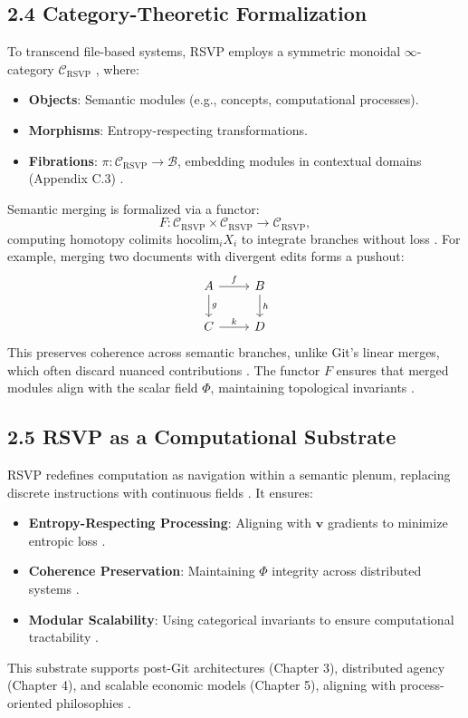 \documentclass[12pt]{article}
\begin{document}
\subsection*{2.4 Category-Theoretic Formalization}

To transcend file-based systems, RSVP employs a symmetric monoidal \(\infty\)-category \(\mathcal{C}_{\text{RSVP}}\) \citep{maclane1998}, where:
\begin{itemize}
    \item \textbf{Objects}: Semantic modules (e.g., concepts, computational processes).
    \item \textbf{Morphisms}: Entropy-respecting transformations.
    \item \textbf{Fibrations}: \(\pi: \mathcal{C}_{\text{RSVP}} \to \mathcal{B}\), embedding modules in contextual domains (Appendix C.3) \citep{lawvere2009}.
\end{itemize}

Semantic merging is formalized via a functor:
\[
F: \mathcal{C}_{\text{RSVP}} \times \mathcal{C}_{\text{RSVP}} \to \mathcal{C}_{\text{RSVP}},
\]
computing homotopy colimits \(\text{hocolim}_i X_i\) to integrate branches without loss \citep{hatcher2002}. For example, merging two documents with divergent edits forms a pushout:
\[
\begin{tikzcd}
A \arrow[r, "f"] \arrow[d, "g"] & B \arrow[d, "h"] \\
C \arrow[r, "k"] & D
\end{tikzcd}
\]
This preserves coherence across semantic branches, unlike Git’s linear merges, which often discard nuanced contributions \citep{milewski2018}. The functor \(F\) ensures that merged modules align with the scalar field \(\Phi\), maintaining topological invariants \citep{may1999}.

\subsection*{2.5 RSVP as a Computational Substrate}

RSVP redefines computation as navigation within a semantic plenum, replacing discrete instructions with continuous fields \citep{bird1988}. It ensures:
\begin{itemize}
    \item \textbf{Entropy-Respecting Processing}: Aligning with \(\mathbf{v}\) gradients to minimize entropic loss \citep{cover2006}.
    \item \textbf{Coherence Preservation}: Maintaining \(\Phi\) integrity across distributed systems \citep{gromov1999}.
    \item \textbf{Modular Scalability}: Using categorical invariants to ensure computational tractability \citep{lawvere2009}.
\end{itemize}
This substrate supports post-Git architectures (Chapter 3), distributed agency (Chapter 4), and scalable economic models (Chapter 5), aligning with process-oriented philosophies \citep{whitehead1978}.
\end{document}
